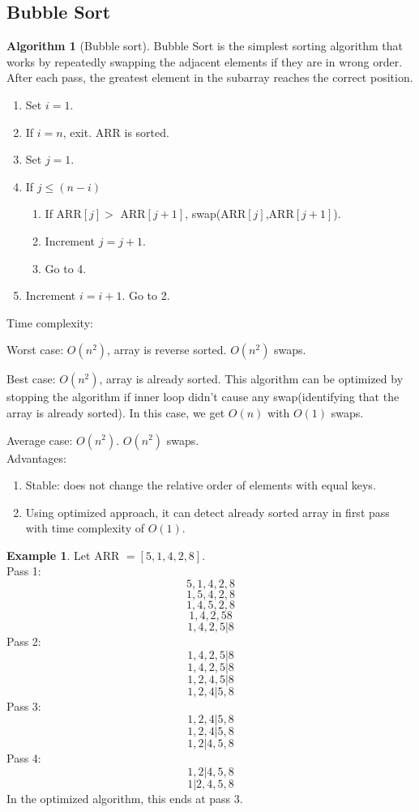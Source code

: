 \documentclass[10pt, a4paper]{extarticle}
\theoremstyle{definition}
\newtheorem{alg}{Algorithm}
\newtheorem{eg}{Example}
\begin{document}
\subsection{Bubble Sort}
\begin{alg}[Bubble sort]
	Bubble Sort is the simplest sorting algorithm that works by repeatedly swapping the adjacent elements if they are in wrong order. After each pass, the greatest element in the subarray reaches the correct position.
	\begin{enumerate}
		\item Set $i=1$.
		\item If $i= n$, exit. ARR is sorted.
		\item Set $j=1$.
		\item If $j\leq (n-i)$
		      \begin{enumerate}
			      \item If ARR$[j]>$ ARR$[j+1]$, swap(ARR$[j]$,ARR$[j+1]$).
			      \item Increment $j=j+1$.
			      \item Go to 4.
		      \end{enumerate}
		\item Increment $i=i+1$. Go to 2.
	\end{enumerate}
	Time complexity:

	Worst case: $O(n^2)$, array is reverse sorted. $O(n^2)$ swaps.

	Best case: $O(n^2)$, array is already sorted. This algorithm can be optimized by stopping the algorithm if inner loop didn’t cause any swap(identifying that the array is already sorted). In this case, we get $O(n)$ with $O(1)$ swaps.

	Average case: $O(n^2)$. $O(n^2)$ swaps.
	\hfill\\
	Advantages:
	\begin{enumerate}
		\item Stable: does not change the relative order of elements with equal keys.
		\item Using optimized approach, it can detect already sorted array in first pass with time complexity of $O(1)$.
	\end{enumerate}

\end{alg}
\begin{eg}
	Let ARR $=[5,1,4,2,8]$.
	\hfill\\
	Pass 1:\[\boxed{5},1,4,2,8\]\[1,\boxed{5},4,2,8\]\[1,4,\boxed{5},2,8\]
	\[1,4,2,\boxed{5}8\]\[1,4,2,5|8\]
	Pass 2:\[\boxed{1},4,2,5|8\]\[1,\boxed{4},2,5|8\]\[1,2,\boxed{4},5|8\]
	\[1,2,4|5,8\]
	Pass 3:\[\boxed{1},2,4|5,8\]\[1,\boxed{2},4|5,8\]\[1,2|4,5,8\]
	Pass 4:\[\boxed{1},2|4,5,8\]\[1|2,4,5,8\]
	In the optimized algorithm, this ends at pass 3.
\end{eg}
\end{document}
